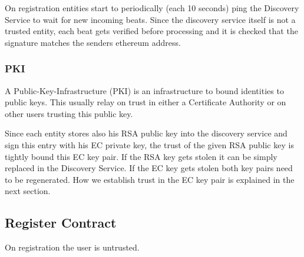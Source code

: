 On registration entities start to periodically (each 10 seconds) ping the Discovery Service to wait for new incoming beats. Since the discovery service itself is not a trusted entity, each beat gets verified before processing and it is checked that the signature matches the senders ethereum address.

\subsubsection{PKI}

A Public-Key-Infrastructure (PKI) is an infrastructure to bound identities to public keys. This usually relay on trust in either a Certificate Authority or on other users trusting this public key. 

Since each entity stores also his RSA public key into the discovery service and sign this entry with his EC private key, the trust of the given RSA public key is tightly bound this EC key pair. If the RSA key gets stolen it can be simply replaced in the Discovery Service. If the EC key gets stolen both key pairs need to be regenerated. How we establish trust in the EC key pair is explained in the next section.

\subsection{Register Contract}
On registration the user is untrusted. 
